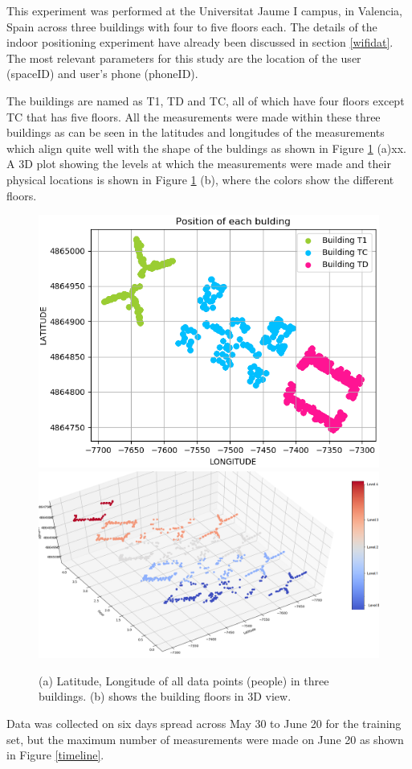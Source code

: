 This experiment was performed at the Universitat Jaume I campus, in Valencia, Spain across three buildings with four to five floors each. The details of the indoor positioning experiment have already been discussed in section \ref{wifidat}. The most relevant parameters for this study are the location of the user (spaceID) and user's phone (phoneID). 

The buildings are named as T1, TD and TC, all of which have four floors except TC that has five floors. All the measurements were made within these three buildings as can be seen in the latitudes and longitudes of the measurements which align quite well with the shape of the buldings as shown in Figure \ref{nama} (a)xx. A 3D plot showing the levels at which the measurements were made and their physical locations is shown in  Figure \ref{nama} (b), where the colors show the different floors. 

\begin{figure}[!h]
    \centering
    \includegraphics[width = 7 cm]{image/Chapters/Chapter6/LatLong.png}\hfill
    \includegraphics[width = 8 cm]{image/Chapters/Chapter6/LatLongFloor.png}
    \\[\smallskipamount]    
    \caption{(a) Latitude, Longitude of all data points (people) in three buildings. (b) shows the building floors in 3D view.}
    \label{nama}
\end{figure}

Data was collected on six days spread across May 30 to June 20 for the training set, but the maximum number of measurements were made on June 20 as shown in Figure \ref{timeline}. 



